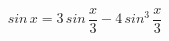 \documentclass[12pt]{amsart}
\begin{document}
\sicpsize
\[
  sin \, x = 3 \, sin \, \frac{x}{3} - 4 \, sin^3 \, \frac{x}{3}
\]
\end{document}
